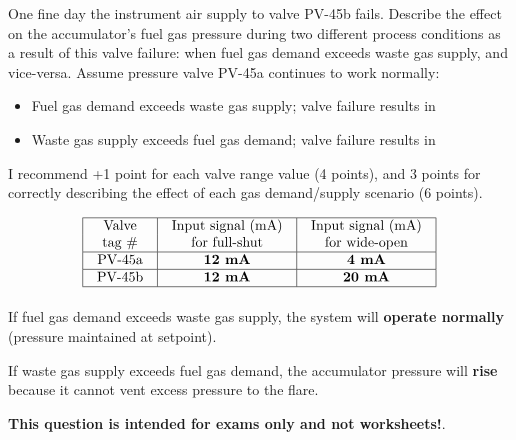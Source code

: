 One fine day the instrument air supply to valve PV-45b fails.  Describe the effect on the accumulator's fuel gas pressure during two different process conditions as a result of this valve failure: when fuel gas demand exceeds waste gas supply, and vice-versa.  Assume pressure valve PV-45a continues to work normally:

\begin{itemize}
\item{} Fuel gas demand exceeds waste gas supply; valve failure results in \underbar{\hskip 100pt}
\vskip 5pt 
\item{} Waste gas supply exceeds fuel gas demand; valve failure results in \underbar{\hskip 100pt}
\end{itemize}







I recommend +1 point for each valve range value (4 points), and 3 points for correctly describing the effect of each gas demand/supply scenario (6 points).


$$\vbox{\offinterlineskip
\halign{\strut
\vrule \quad\hfil # \ \hfil & 
\vrule \quad\hfil # \ \hfil & 
\vrule \quad\hfil # \ \hfil \vrule \cr
\noalign{\hrule}
%
Valve & Input signal (mA) & Input signal (mA) \cr
%
tag \# & for full-shut & for wide-open \cr
%
\noalign{\hrule}
%
PV-45a & {\bf 12 mA} & {\bf 4 mA} \cr
%
\noalign{\hrule}
%
PV-45b & {\bf 12 mA} & {\bf 20 mA} \cr
%
\noalign{\hrule}
} %
}$$ %

If fuel gas demand exceeds waste gas supply, the system will {\bf operate normally} (pressure maintained at setpoint).

\vskip 10pt

If waste gas supply exceeds fuel gas demand, the accumulator pressure will {\bf rise} because it cannot vent excess pressure to the flare.







{\bf This question is intended for exams only and not worksheets!}.




